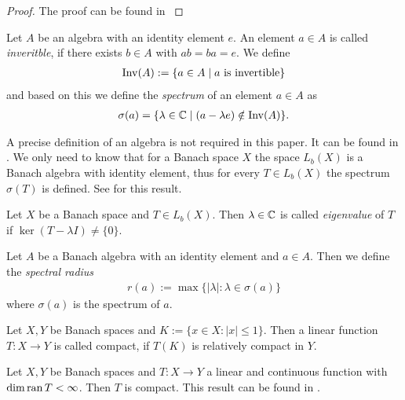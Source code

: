 \begin{proof}
	The proof can be found in \cite[p. 50]{FAna1}
\end{proof}

\begin{definition}
	Let $A$ be an algebra with an identity element $e$. An element $a \in A$ is called \textit{inveritble}, if there exists $b \in A$ with $ab = ba = e$. We define
	\begin{align*}
		\operatorname{Inv}(A) := \{a \in A \mid a \text{ is invertible}\}
	\end{align*}
	and based on this we define the \textit{spectrum} of an element $a \in A$ as
	\begin{align*}
		\sigma(a) = \{\lambda \in \mathbb{C} \mid (a - \lambda e) \notin \operatorname{Inv}(A)\}.
	\end{align*}
\end{definition}

\begin{remark}
	A precise definition of an algebra is not required in this paper. It can be found in \cite[p. 122]{FAna1}. We only need to know that for a Banach space $X$ the space $L_b(X)$ is a Banach algebra with identity element, thus for every $T \in L_b(X)$ the spectrum $\sigma(T)$ is defined. See \cite[p.121-122]{FAna1} for this result. 
\end{remark}

\begin{definition}
	Let $X$ be a Banach space and $T \in L_b(X)$. Then $\lambda \in \mathbb{C}$ is called \textit{eigenvalue} of $T$ if $\ker(T - \lambda I) \neq \{0\}$. 
\end{definition}

\begin{definition}
	Let $A$ be a Banach algebra with an identity element and $a \in A$. Then we define the \textit{spectral radius}
	\begin{align*}
		r(a) := \max\{|\lambda| : \lambda \in \sigma(a)\}
	\end{align*}
	where $\sigma(a)$ is the spectrum of $a$.
\end{definition}

\begin{definition}
	Let $X, Y$ be Banach spaces and $K := \{x \in X: |x| \leq 1\}$. Then a linear function $T: X \to Y$ is called compact, if $T(K)$ is relatively compact in $Y$. 
\end{definition}

\begin{remark} \label{remark:compact}
	Let $X, Y$ be Banach spaces and $T:X \to Y$ a linear and continuous function with $\dim \operatorname{ran} T < \infty$. Then $T$ is compact. This result can be found in \cite[p. 133]{FAna1}.
\end{remark}

